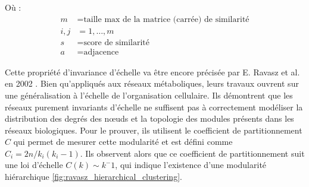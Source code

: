 Où :
\begin{align*}
    m &= \text{taille max de la matrice (carrée) de similarité} \\
    i, j &= 1, …, m \\
    s &= \text{score de similarité} \\
    a &= \text{adjacence}
\end{align*}


Cette propriété d'invariance d'échelle va être encore précisée par E. Ravasz et al. en 2002 \cite{Ravasz2002}. Bien qu'appliqués aux réseaux métaboliques, leurs travaux ouvrent sur une généralisation à l'échelle de l'organisation cellulaire. Ils démontrent que les réseaux purement invariants d'échelle ne suffisent pas à correctement modéliser la distribution des degrés des nœuds et la topologie des modules présents dans les réseaux biologiques. Pour le prouver, ils utilisent le coefficient de partitionnement $C$ qui permet de mesurer cette modularité et est défini comme $C_{i}=2 n / k_{i}\left(k_{i}-1\right)$. Ils observent alors que ce coefficient de partitionnement suit une loi d'échelle $C(k) \sim k^-1$, qui indique l'existence d'une modularité hiérarchique \ref{fig:ravasz_hierarchical_clustering}.

